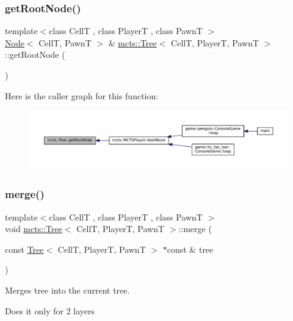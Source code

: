 \subsubsection{\texorpdfstring{get\+Root\+Node()}{getRootNode()}}
{\footnotesize\ttfamily template$<$class CellT , class PlayerT , class PawnT $>$ \\
\hyperlink{structmcts_1_1_node}{Node}$<$ CellT, PawnT $>$ \& \hyperlink{classmcts_1_1_tree}{mcts\+::\+Tree}$<$ CellT, PlayerT, PawnT $>$\+::get\+Root\+Node (\begin{DoxyParamCaption}{ }\end{DoxyParamCaption})}

Here is the caller graph for this function\+:
\nopagebreak
\begin{figure}[H]
\begin{center}
\leavevmode
\includegraphics[width=350pt]{classmcts_1_1_tree_a75496cb3742583b221c1b95d8fd85718_icgraph}
\end{center}
\end{figure}
\mbox{\label{classmcts_1_1_tree_a06139b9922488bb26feb25745e54e508}} 
\subsubsection{\texorpdfstring{merge()}{merge()}}
{\footnotesize\ttfamily template$<$class CellT , class PlayerT , class PawnT $>$ \\
void \hyperlink{classmcts_1_1_tree}{mcts\+::\+Tree}$<$ CellT, PlayerT, PawnT $>$\+::merge (\begin{DoxyParamCaption}\item[{const \hyperlink{classmcts_1_1_tree}{Tree}$<$ CellT, PlayerT, PawnT $>$ $\ast$const \&}]{tree }\end{DoxyParamCaption})}



Merges tree into the current tree. 

Does it only for 2 layers


